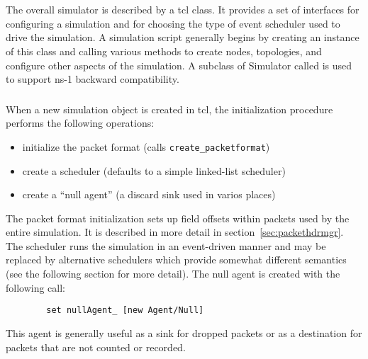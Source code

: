 %
%
\chapter{}

The overall simulator is described by a  tcl class.
It provides a set of interfaces for configuring a simulation
and for choosing the type of event scheduler used to drive
the simulation.
A simulation script generally begins by creating an instance
of this class and calling various methods to create nodes, topologies,
and configure other aspects of the simulation.
A subclass of Simulator called  is used to support
ns-1 backward compatibility.

\subsection{}

When a new simulation object is created in tcl, the initialization
procedure performs the following operations:
\begin{itemize}
        \item initialize the packet format (calls {\tt create\_packetformat})
        \item create a scheduler (defaults to a simple linked-list scheduler)
        \item create a ``null agent'' (a discard sink used in varios places)
\end{itemize}
The packet format initialization sets up field offsets within packets
used by the entire simulation.  It is described in more detail
in section~\ref{sec:packethdrmgr}.
The scheduler runs the simulation in an event-driven manner and may
be replaced by alternative schedulers which provide somewhat
different semantics (see the following section for more detail).
The null agent is created with the following call:
\begin{small}
\begin{verbatim}
        set nullAgent_ [new Agent/Null]
\end{verbatim}
\end{small}
This agent is generally useful as a sink for dropped packets or
as a destination for packets that are not counted or recorded.

\subsection{}

